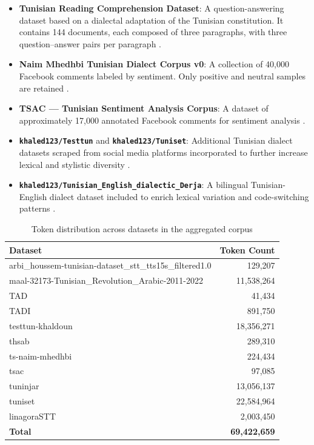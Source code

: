 \documentclass[12pt,a4paper]{report}
\begin{document}
\begin{itemize}
\begin{itemize}
        \item \textbf{Tunisian Reading Comprehension Dataset}:
        A question-answering dataset based on a dialectal adaptation of the
        Tunisian constitution. It contains 144 documents, each composed of three
        paragraphs, with three question--answer pairs per paragraph
        \citep{tunisian_rc}.

        \item \textbf{Naim Mhedhbi Tunisian Dialect Corpus v0}:
        A collection of 40{,}000 Facebook comments labeled by sentiment.
        Only positive and neutral samples are retained
        \citep{mhedhbi_tunisian_v0}.

        \item \textbf{TSAC — Tunisian Sentiment Analysis Corpus}:
        A dataset of approximately 17{,}000 annotated Facebook comments for
        sentiment analysis \citep{tsac}.

        \item \textbf{\texttt{khaled123/Testtun}} and
        \textbf{\texttt{khaled123/Tuniset}}:
        Additional Tunisian dialect datasets scraped from social media platforms
        incorporated to further increase lexical and stylistic diversity
        \citep{testtun,tuniset}.

        \item \textbf{\texttt{khaled123/Tunisian\_English\_dialectic\_Derja}}:
        A bilingual Tunisian-English dialect dataset included to enrich lexical
        variation and code-switching patterns
        \citep{Tunisian_English_dialectic_Derja}.

    \end{itemize}

\end{itemize}

        \begin{table}[h]
\centering
\caption{Token distribution across datasets in the aggregated corpus}
\label{tab:token_distribution}
\begin{tabular}{l r}
\hline
\textbf{Dataset} & \textbf{Token Count} \\
\hline
arbi\_houssem-tunisian-dataset\_stt\_tts15s\_filtered1.0 & 129{,}207 \\
maal-32173-Tunisian\_Revolution\_Arabic-2011-2022 & 11{,}538{,}264 \\
TAD & 41{,}434 \\
TADI & 891{,}750 \\
testtun-khaldoun & 18{,}356{,}271 \\
thsab & 289{,}310 \\
ts-naim-mhedhbi & 224{,}434 \\
tsac & 97{,}085 \\
tuninjar & 13{,}056{,}137 \\
tuniset & 22{,}584{,}964 \\
linagoraSTT & 2{,}003{,}450 \\
\hline
\textbf{Total} & \textbf{69{,}422{,}659} \\
\hline
\end{tabular}
\end{table}
\end{document}
